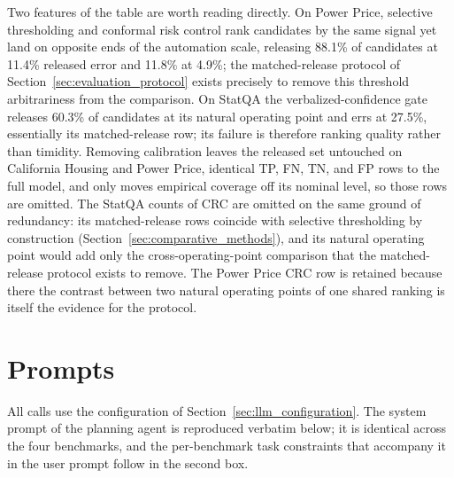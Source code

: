 \documentclass[preprint,12pt,authoryear]{elsarticle}
\begin{document}
Two features of the table are worth reading directly.
On Power Price, selective thresholding and conformal risk control rank candidates by the same signal yet land on opposite ends of the automation scale, releasing 88.1\% of candidates at 11.4\% released error and 11.8\% at 4.9\%; the matched-release protocol of Section~\ref{sec:evaluation_protocol} exists precisely to remove this threshold arbitrariness from the comparison.
On StatQA the verbalized-confidence gate releases 60.3\% of candidates at its natural operating point and errs at 27.5\%, essentially its matched-release row; its failure is therefore ranking quality rather than timidity.
Removing calibration leaves the released set untouched on California Housing and Power Price, identical TP, FN, TN, and FP rows to the full model, and only moves empirical coverage off its nominal level, so those rows are omitted.
The StatQA counts of CRC are omitted on the same ground of redundancy: its matched-release rows coincide with selective thresholding by construction (Section~\ref{sec:comparative_methods}), and its natural operating point would add only the cross-operating-point comparison that the matched-release protocol exists to remove.
The Power Price CRC row is retained because there the contrast between two natural operating points of one shared ranking is itself the evidence for the protocol.


\section{Prompts}
\label{app:prompts}


All calls use the configuration of Section~\ref{sec:llm_configuration}.
The system prompt of the planning agent is reproduced verbatim below; it is identical across the four benchmarks, and the per-benchmark task constraints that accompany it in the user prompt follow in the second box.
\end{document}
